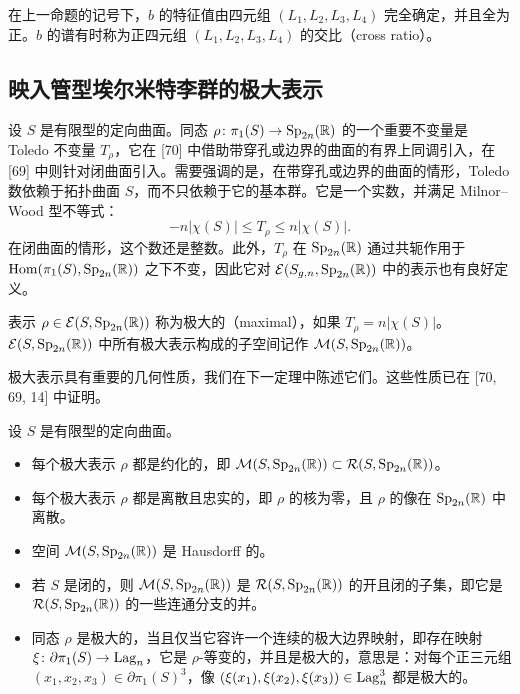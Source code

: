 \begin{remark}[11.17]
在上一命题的记号下，$b$ 的特征值由四元组 $(L_1,L_2,L_3,L_4)$ 完全确定，并且全为正。$b$ 的谱有时称为正四元组 $(L_1,L_2,L_3,L_4)$ 的交比（cross ratio）。
\end{remark}


\subsection{映入管型埃尔米特李群的极大表示}

设 $S$ 是有限型的定向曲面。同态 $\rho\colon\pi_1(S)\to\operatorname{Sp}_{2n}(\mathbb{R})$ 的一个重要不变量是 Toledo 不变量 $T_\rho$，它在 [70] 中借助带穿孔或边界的曲面的有界上同调引入，在 [69] 中则针对闭曲面引入。需要强调的是，在带穿孔或边界的曲面的情形，Toledo 数依赖于拓扑曲面 $S$，而不只依赖于它的基本群。它是一个实数，并满足 Milnor--Wood 型不等式：
\[
-n|\chi(S)|\le T_\rho\le n|\chi(S)|.
\]
在闭曲面的情形，这个数还是整数。此外，$T_\rho$ 在 $\operatorname{Sp}_{2n}(\mathbb{R})$ 通过共轭作用于 $\operatorname{Hom}(\pi_1(S),\operatorname{Sp}_{2n}(\mathbb{R}))$ 之下不变，因此它对 $\mathcal{E}(S_{g,n},\operatorname{Sp}_{2n}(\mathbb{R}))$ 中的表示也有良好定义。

\begin{definition}[11.18]
表示 $\rho\in\mathcal{E}(S,\operatorname{Sp}_{2n}(\mathbb{R}))$ 称为极大的（maximal），如果 $T_\rho=n|\chi(S)|$。$\mathcal{E}(S,\operatorname{Sp}_{2n}(\mathbb{R}))$ 中所有极大表示构成的子空间记作 $\mathcal{M}(S,\operatorname{Sp}_{2n}(\mathbb{R}))$。
\end{definition}

极大表示具有重要的几何性质，我们在下一定理中陈述它们。这些性质已在 [70, 69, 14] 中证明。

\begin{theorem}[11.19]
设 $S$ 是有限型的定向曲面。
\begin{itemize}
\item 每个极大表示 $\rho$ 都是约化的，即 $\mathcal{M}(S,\operatorname{Sp}_{2n}(\mathbb{R}))\subset\mathcal{R}(S,\operatorname{Sp}_{2n}(\mathbb{R}))$。
\item 每个极大表示 $\rho$ 都是离散且忠实的，即 $\rho$ 的核为零，且 $\rho$ 的像在 $\operatorname{Sp}_{2n}(\mathbb{R})$ 中离散。
\item 空间 $\mathcal{M}(S,\operatorname{Sp}_{2n}(\mathbb{R}))$ 是 Hausdorff 的。
\item 若 $S$ 是闭的，则 $\mathcal{M}(S,\operatorname{Sp}_{2n}(\mathbb{R}))$ 是 $\mathcal{R}(S,\operatorname{Sp}_{2n}(\mathbb{R}))$ 的开且闭的子集，即它是 $\mathcal{R}(S,\operatorname{Sp}_{2n}(\mathbb{R}))$ 的一些连通分支的并。
\item 同态 $\rho$ 是极大的，当且仅当它容许一个连续的极大边界映射，即存在映射 $\xi\colon\partial\pi_1(S)\to\operatorname{Lag}_n$，它是 $\rho$-等变的，并且是极大的，意思是：对每个正三元组 $(x_1,x_2,x_3)\in\partial\pi_1(S)^{3}$，像 $(\xi(x_1),\xi(x_2),\xi(x_3))\in\operatorname{Lag}_n^{3}$ 都是极大的。
\end{itemize}
\end{theorem}

